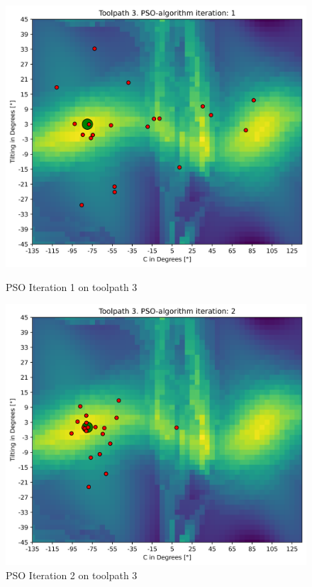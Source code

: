 \begin{figure}[H]
	\centering
	\begin{minipage}{0.5\textwidth}
		\includegraphics[width=\textwidth]{figures/swarm_true/3_1.png}
		\caption{PSO Iteration 1 on toolpath 3}
		\label{1_true}
	\end{minipage}\hfill
	\begin{minipage}{0.5\textwidth}
		\includegraphics[width=\textwidth]{figures/swarm_true/3_2.png}
		\caption{PSO Iteration 2 on toolpath 3}
		\label{2_true}
	\end{minipage}\par
\end{figure}	

